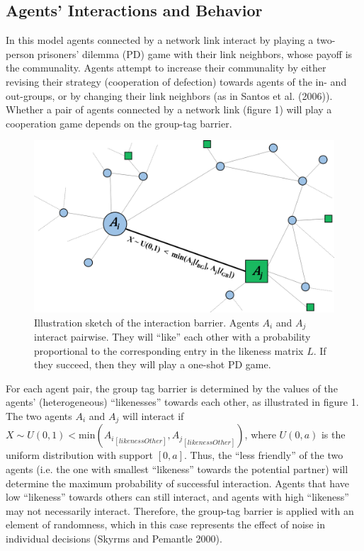 \subsection{Agents' Interactions and Behavior}
In this model agents connected by a network link interact by playing a two-person prisoners' dilemma (PD) game with their link neighbors, whose payoff is the communality. Agents attempt to increase their communality by either revising their strategy (cooperation of defection) towards agents of the in- and out-groups, or by changing their link neighbors (as in Santos et al. (2006)). Whether a pair of agents connected by a network link (figure 1) will play a cooperation game depends on the group-tag barrier. 
\begin{figure}[t!]
	\label{fig:InteractionBarrier}
	\centering\includegraphics[width=1.0\linewidth]{figures/InteractionBarrier}
	\caption{Illustration sketch of the interaction barrier. Agents $ A_i $ and $ A_j $ interact pairwise. They will ``like'' each other with a probability proportional to the corresponding entry in the likeness matrix $ L $. If they succeed, then they will play a one-shot PD game.}
\end{figure}

For each agent pair, the group tag barrier is determined by the values of the agents' (heterogeneous) ``likenesses'' towards each other, as illustrated in figure 1. The two agents $ A_{i} $ and $ A_{j} $ will interact if  $ X \sim U(0,1) < \text{min}({A_{i}}_{[likenessOther]}, {A_{j}}_{[likenessOther]} ) $, where $ U(0,a) $ is the uniform distribution with support $ [0,a] $. Thus, the ``less friendly'' of the two agents (i.e. the one with smallest ``likeness'' towards the potential partner) will determine the maximum probability of successful interaction. Agents that have low ``likeness'' towards others can still interact, and agents with high ``likeness'' may not necessarily interact. Therefore, the group-tag barrier is applied with an element of randomness, which in this case represents the effect of noise in individual decisions (Skyrms and Pemantle 2000).

